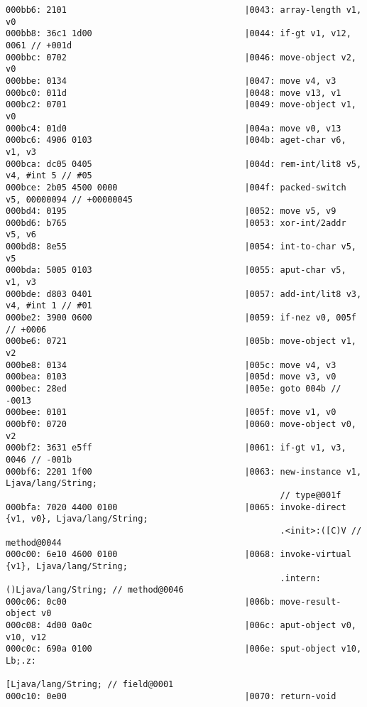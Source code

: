 \begin{lstlisting}
000bb6: 2101                                   |0043: array-length v1, v0
000bb8: 36c1 1d00                              |0044: if-gt v1, v12, 0061 // +001d
000bbc: 0702                                   |0046: move-object v2, v0
000bbe: 0134                                   |0047: move v4, v3
000bc0: 011d                                   |0048: move v13, v1
000bc2: 0701                                   |0049: move-object v1, v0
000bc4: 01d0                                   |004a: move v0, v13
000bc6: 4906 0103                              |004b: aget-char v6, v1, v3
000bca: dc05 0405                              |004d: rem-int/lit8 v5, v4, #int 5 // #05
000bce: 2b05 4500 0000                         |004f: packed-switch v5, 00000094 // +00000045
000bd4: 0195                                   |0052: move v5, v9
000bd6: b765                                   |0053: xor-int/2addr v5, v6
000bd8: 8e55                                   |0054: int-to-char v5, v5
000bda: 5005 0103                              |0055: aput-char v5, v1, v3
000bde: d803 0401                              |0057: add-int/lit8 v3, v4, #int 1 // #01
000be2: 3900 0600                              |0059: if-nez v0, 005f // +0006
000be6: 0721                                   |005b: move-object v1, v2
000be8: 0134                                   |005c: move v4, v3
000bea: 0103                                   |005d: move v3, v0
000bec: 28ed                                   |005e: goto 004b // -0013
000bee: 0101                                   |005f: move v1, v0
000bf0: 0720                                   |0060: move-object v0, v2
000bf2: 3631 e5ff                              |0061: if-gt v1, v3, 0046 // -001b
000bf6: 2201 1f00                              |0063: new-instance v1, Ljava/lang/String;
                                                      // type@001f
000bfa: 7020 4400 0100                         |0065: invoke-direct {v1, v0}, Ljava/lang/String;
                                                      .<init>:([C)V // method@0044
000c00: 6e10 4600 0100                         |0068: invoke-virtual {v1}, Ljava/lang/String;
                                                      .intern:()Ljava/lang/String; // method@0046
000c06: 0c00                                   |006b: move-result-object v0
000c08: 4d00 0a0c                              |006c: aput-object v0, v10, v12
000c0c: 690a 0100                              |006e: sput-object v10, Lb;.z:
                                                      [Ljava/lang/String; // field@0001
000c10: 0e00                                   |0070: return-void

\end{lstlisting}
